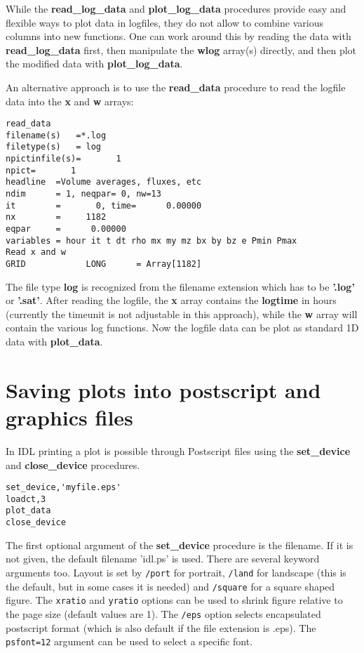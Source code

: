 \documentclass{article}
\begin{document}
While the {\bf read\_log\_data} and {\bf plot\_log\_data} procedures 
provide easy and flexible ways to plot data in logfiles, 
they do not allow to combine various columns
into new functions. One can work around this by reading the data
with {\bf read\_log\_data} first, then manipulate the {\bf wlog} array(s) 
directly, and then plot the modified data with {\bf plot\_log\_data}. 

An alternative approach is to use the {\bf read\_data} procedure to read
the logfile data into the {\bf x} and {\bf w} arrays:
\begin{verbatim}
read_data
filename(s)   =*.log
filetype(s)   = log
npictinfile(s)=       1
npict=       1
headline  =Volume averages, fluxes, etc
ndim      = 1, neqpar= 0, nw=13
it        =       0, time=      0.00000
nx        =     1182
eqpar     =      0.00000
variables = hour it t dt rho mx my mz bx by bz e Pmin Pmax
Read x and w
GRID            LONG      = Array[1182]
\end{verbatim}
The file type {\bf log} is recognized from the filename extension which
has to be {\bf '.log'} or {\bf '.sat'}. After reading the logfile,
the {\bf x} array contains the {\bf logtime} in hours 
(currently the timeunit is not adjustable in this approach), 
while the {\bf w} array will contain the various log functions. 
Now the logfile data can be plot as standard 1D data with {\bf plot\_data}.

\section{Saving plots into postscript and graphics files 
                \label{s-postscript}}

In IDL printing a plot is possible through Postscript files
using the {\bf set\_device} and {\bf close\_device} procedures.
\begin{verbatim}
set_device,'myfile.eps'
loadct,3
plot_data
close_device
\end{verbatim}
The first optional argument of the {\bf set\_device} procedure is the filename.
If it is not given, the default filename 'idl.ps' is used.
There are several keyword arguments too. Layout is set by 
{\tt /port} for portrait, {\tt /land} for landscape 
(this is the default, but in some cases it is needed)
and {\tt /square} for a square shaped figure.
The {\tt xratio} and {\tt yratio} options can be used
to shrink figure relative to the page size (default values are 1).
The {\tt /eps} option selects encapsulated postscript format (which is also
default if the file extension is .eps).
The {\tt psfont=12} argument can be used to select a specific font. 
\end{document}
